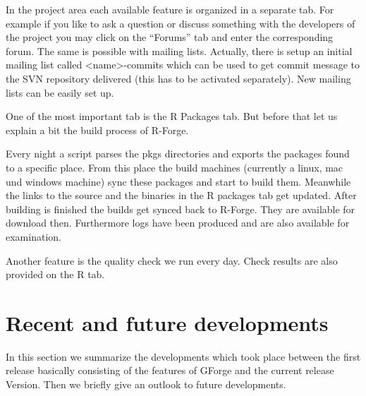 In the project area each available feature is organized in a separate
tab. For example if you like to ask a question or discuss something
with the developers of the project you may click on the ``Forums'' tab
and enter the corresponding forum. The same is possible with mailing
lists. Actually, there is setup an initial mailing list called
<name>-commits which can be used to get commit message to the SVN
repository delivered (this has to be activated separately). New
mailing lists can be easily set up.

One of the most important tab is the R Packages tab. But before that
let us explain a bit the build process of R-Forge.

Every night a script parses the pkgs directories and exports the
packages found to a specific place. From this place the build machines
(currently a linux, mac und windows machine) sync these packages and
start to build them. Meanwhile the links to the source and the
binaries in the R packages tab get updated. After building is finished
the builds get synced back to R-Forge. They are available for download
then. Furthermore logs have been produced and are also available for
examination.

Another feature is the quality check we run every day. Check results
are also provided on the R tab.


\section*{Recent and future developments}
In this section we summarize the developments which took place between
the first release basically consisting of the features of GForge and
the current release Version. Then we briefly give an outlook to future
developments.

